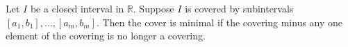 Let $I$ be a closed interval in $\mathbb{R}$. Suppose $I$ is covered by subintervals $[a_1, b_1], \ldots, [a_m, b_m]$. Then the cover is minimal if the covering minus any one element of the covering is no longer a covering.
